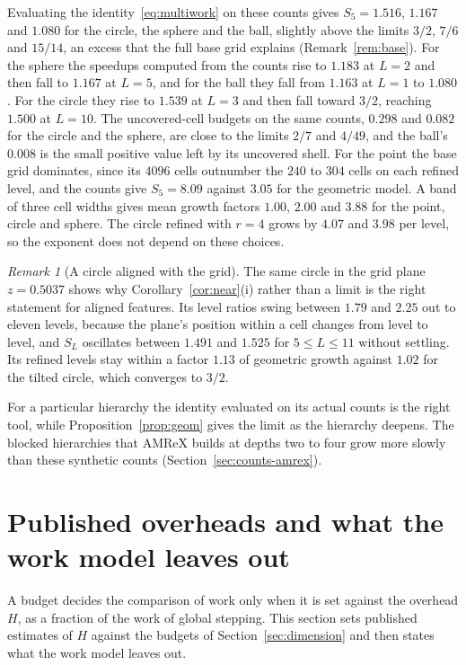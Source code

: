 \documentclass[12pt]{article}
\theoremstyle{remark}
\newtheorem{remark}{Remark}
\begin{document}
Evaluating the identity~\eqref{eq:multiwork} on these counts gives $S_5=1.516$, $1.167$ and $1.080$ for the circle, the sphere and the ball, slightly above the limits $3/2$, $7/6$ and $15/14$, an excess that the full base grid explains (Remark~\ref{rem:base}). For the sphere the speedups computed from the counts rise to $1.183$ at $L=2$ and then fall to $1.167$ at $L=5$, and for the ball they fall from $1.163$ at $L=1$ to $1.080$. For the circle they rise to $1.539$ at $L=3$ and then fall toward $3/2$, reaching $1.500$ at $L=10$. The uncovered-cell budgets on the same counts, $0.298$ and $0.082$ for the circle and the sphere, are close to the limits $2/7$ and $4/49$, and the ball's $0.008$ is the small positive value left by its uncovered shell. For the point the base grid dominates, since its $4096$ cells outnumber the $240$ to $304$ cells on each refined level, and the counts give $S_5=8.09$ against $3.05$ for the geometric model. A band of three cell widths gives mean growth factors $1.00$, $2.00$ and $3.88$ for the point, circle and sphere. The circle refined with $r=4$ grows by $4.07$ and $3.98$ per level, so the exponent does not depend on these choices.

\begin{remark}[A circle aligned with the grid]\label{rem:aligned}
The same circle in the grid plane $z=0.5037$ shows why Corollary~\ref{cor:near}(i) rather than a limit is the right statement for aligned features. Its level ratios swing between $1.79$ and $2.25$ out to eleven levels, because the plane's position within a cell changes from level to level, and $S_L$ oscillates between $1.491$ and $1.525$ for $5\le L\le 11$ without settling. Its refined levels stay within a factor $1.13$ of geometric growth against $1.02$ for the tilted circle, which converges to $3/2$.
\end{remark}

For a particular hierarchy the identity evaluated on its actual counts is the right tool, while Proposition~\ref{prop:geom} gives the limit as the hierarchy deepens. The blocked hierarchies that AMReX builds at depths two to four grow more slowly than these synthetic counts (Section~\ref{sec:counts-amrex}).

\section{Published overheads and what the work model leaves out}\label{sec:overheads}

A budget decides the comparison of work only when it is set against the overhead $H$, as a fraction of the work of global stepping. This section sets published estimates of $H$ against the budgets of Section~\ref{sec:dimension} and then states what the work model leaves out.
\end{document}
